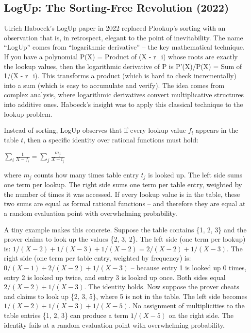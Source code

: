 \documentclass[
  11pt,
  openany]{report}
\begin{document}
\subsection{LogUp: The Sorting-Free Revolution
(2022)}\label{logup-the-sorting-free-revolution-2022}

Ulrich Haboeck's LogUp paper in 2022 replaced Plookup's sorting with an
observation that is, in retrospect, elegant to the point of inevitability. The
name ``LogUp'' comes from ``logarithmic derivative'' -- the key mathematical
technique. If you have a polynomial P(X) = Product of (X - r\_i) whose roots are
exactly the lookup values, then the logarithmic derivative of P is P'(X)/P(X) =
Sum of 1/(X - r\_i). This transforms a product (which is hard to check
incrementally) into a sum (which is easy to accumulate and verify). The idea
comes from complex analysis, where logarithmic derivatives convert
multiplicative structures into additive ones. Haboeck's insight was to apply
this classical technique to the lookup problem.

Instead of sorting, LogUp observes that if every lookup value \(f_i\) appears in
the table \(t\), then a specific identity over rational functions must hold:

\(\sum_i \frac{1}{X - f_i} = \sum_j \frac{m_j}{X - t_j}\)

where \(m_j\) counts how many times table entry \(t_j\) is looked up. The left
side sums one term per lookup. The right side sums one term per table entry,
weighted by the number of times it was accessed. If every lookup value is in the
table, these two sums are equal as formal rational functions -- and therefore
they are equal at a random evaluation point with overwhelming probability.

A tiny example makes this concrete. Suppose the table contains \{1, 2, 3\} and
the prover claims to look up the values \{2, 3, 2\}. The left side (one term per
lookup) is: \(1/(X-2) + 1/(X-3) + 1/(X-2) = 2/(X-2) + 1/(X-3)\). The right side
(one term per table entry, weighted by frequency) is:
\(0/(X-1) + 2/(X-2) + 1/(X-3)\) -- because entry 1 is looked up 0 times, entry 2
is looked up twice, and entry 3 is looked up once. Both sides equal
\(2/(X-2) + 1/(X-3)\). The identity holds. Now suppose the prover cheats and
claims to look up \{2, 3, 5\}, where 5 is not in the table. The left side
becomes \(1/(X-2) + 1/(X-3) + 1/(X-5)\). No assignment of multiplicities to the
table entries \{1, 2, 3\} can produce a term \(1/(X-5)\) on the right side. The
identity fails at a random evaluation point with overwhelming probability.
\end{document}
